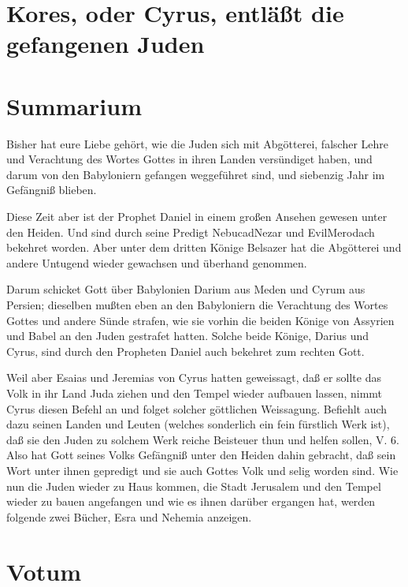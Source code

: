 \section{Kores, oder Cyrus, entläßt die gefangenen Juden}


\section{Summarium}

Bisher hat eure Liebe gehört, wie die Juden sich mit Abgötterei, falscher Lehre und Verachtung des Wortes Gottes in ihren Landen versündiget haben, und darum von den Babyloniern gefangen weggeführet sind, und siebenzig Jahr im Gefängniß blieben.

Diese Zeit aber ist der Prophet Daniel in einem großen Ansehen gewesen unter den Heiden. Und sind durch seine Predigt NebucadNezar und EvilMerodach bekehret worden. Aber unter dem dritten Könige Belsazer hat die Abgötterei und andere Untugend wieder gewachsen und überhand genommen.

Darum schicket Gott über Babylonien Darium aus Meden und Cyrum aus Persien; dieselben mußten eben an den Babyloniern die Verachtung des Wortes Gottes und andere Sünde strafen, wie sie vorhin die beiden Könige von Assyrien und Babel an den Juden gestrafet hatten. Solche beide Könige, Darius und Cyrus, sind durch den Propheten Daniel auch bekehret zum rechten Gott.

Weil aber Esaias und Jeremias von Cyrus hatten geweissagt, daß er sollte das Volk in ihr Land Juda ziehen und den Tempel wieder aufbauen lassen, nimmt Cyrus diesen Befehl an und folget solcher göttlichen Weissagung. Befiehlt auch dazu seinen Landen und Leuten (welches sonderlich ein fein fürstlich Werk ist), daß sie den Juden zu solchem Werk reiche Beisteuer thun und helfen sollen, V. 6. Also hat Gott seines Volks Gefängniß unter den Heiden dahin gebracht, daß sein Wort unter ihnen gepredigt und sie auch Gottes Volk und selig worden sind. Wie nun die Juden wieder zu Haus kommen, die Stadt Jerusalem und den Tempel wieder zu bauen angefangen und wie es ihnen darüber ergangen hat, werden folgende zwei Bücher, Esra und Nehemia anzeigen.

\section{Votum}

